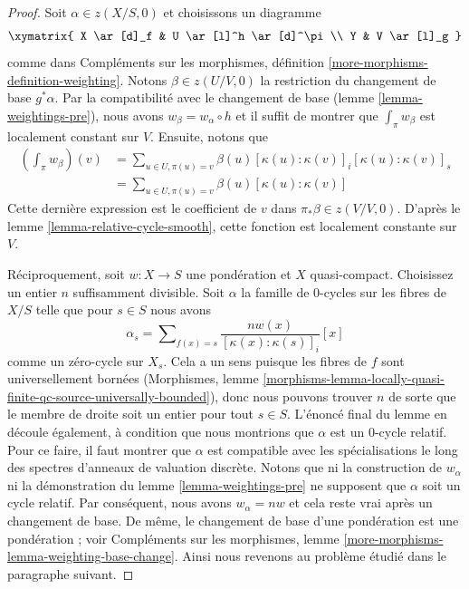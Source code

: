 \begin{proof} 
Soit  $\alpha \in z(X/S, 0)$  et choisissons un diagramme 
$$
\xymatrix{
X \ar[d]_f & U \ar[l]^h \ar[d]^\pi \\
Y & V \ar[l]_g
}
$$
 comme dans Compléments sur les morphismes, définition \ref{more-morphisms-definition-weighting}. 
Notons  $\beta \in z(U/V, 0)$  la restriction du changement de base  $g^*\alpha$.
 Par la compatibilité avec le changement de base (lemme \ref{lemma-weightings-pre}), 
nous avons  $w_\beta = w_\alpha \circ h$  et il suffit de montrer que  
$\int_\pi w_\beta$  est localement constant sur  $V$. Ensuite, notons que 
\begin{align*} 
\left( \int_\pi w_\beta \right)(v) 
& = 
\sum\nolimits_{u \in U, \pi(u) = v} 
\beta(u) [\kappa(u) : \kappa(v)]_i [\kappa(u) : \kappa(v)]_s \\
& = 
\sum\nolimits_{u \in U, \pi(u) = v} \beta(u)[\kappa(u) : \kappa(v)] 
\end{align*} 
Cette dernière expression est le coefficient de  $v$  dans  $\pi_*\beta \in z(V/V, 0)$. 
D'après le lemme \ref{lemma-relative-cycle-smooth}, cette fonction est localement 
constante sur $V$. 

\medskip\noindent
 Réciproquement, soit  $w : X \to S$  une pondération et  $X$  quasi-compact.
 Choisissez un entier  $n$ suffisamment divisible. Soit  $\alpha$  la famille 
de  $0$-cycles sur les fibres de  $X/S$  telle que pour $s \in S$  nous avons 
$$
\alpha_s =
\sum\nolimits_{f(x) = s} \frac{n w(x)}{[\kappa(x) : \kappa(s)]_i} [x]
$$
 comme un zéro-cycle sur  $X_s$.
 Cela a un sens puisque les fibres de $f$  sont universellement bornées
 (Morphismes, lemme 
\ref{morphisms-lemma-locally-quasi-finite-qc-source-universally-bounded}), donc 
nous pouvons trouver  $n$  de sorte que le membre de droite soit un entier pour 
tout  $s \in S$. L'énoncé final du lemme en découle également, à condition que nous montrions
 que  $\alpha$  est un  $0$-cycle relatif. Pour ce faire, il faut 
montrer que  $\alpha$  est compatible avec les spécialisations le long des spectres
 d'anneaux de valuation discrète. Notons que ni la construction de $w_\alpha$
  ni la démonstration du lemme \ref{lemma-weightings-pre} ne supposent que  $\alpha$
 soit un cycle relatif. Par conséquent, nous avons  $w_\alpha = nw$  et cela reste vrai 
après un changement de base. De même, le changement de base d'une pondération est une
 pondération ; voir 
Compléments sur les morphismes, lemme \ref{more-morphisms-lemma-weighting-base-change}. 
Ainsi nous revenons au problème étudié dans le paragraphe suivant. 


\end{proof}
